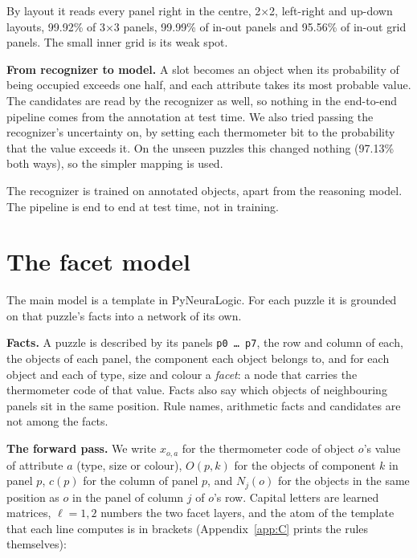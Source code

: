 By layout it reads every panel right in the centre, 2×2, left-right and up-down layouts, 99.92\% of 3×3 panels, 99.99\% of in-out panels and 95.56\% of in-out grid panels. The small inner grid is its weak spot.

\textbf{From recognizer to model.} A slot becomes an object when its probability of being occupied exceeds one half, and each attribute takes its most probable value. The candidates are read by the recognizer as well, so nothing in the end-to-end pipeline comes from the annotation at test time. We also tried passing the recognizer's uncertainty on, by setting each thermometer bit to the probability that the value exceeds it. On the unseen puzzles this changed nothing (97.13\% both ways), so the simpler mapping is used.

The recognizer is trained on annotated objects, apart from the reasoning model. The pipeline is end to end at test time, not in training.

\section{The facet model}\label{sec:4.4}

The main model is a template in PyNeuraLogic. For each puzzle it is grounded on that puzzle's facts into a network of its own.

\textbf{Facts.} A puzzle is described by its panels \texttt{p0 … p7}, the row and column of each, the objects of each panel, the component each object belongs to, and for each object and each of type, size and colour a \emph{facet}: a node that carries the thermometer code of that value. Facts also say which objects of neighbouring panels sit in the same position. Rule names, arithmetic facts and candidates are not among the facts.

\textbf{The forward pass.} We write \(x_{o,a}\) for the thermometer code of object \(o\)'s value of attribute \(a\) (type, size or colour), \(O(p,k)\) for the objects of component \(k\) in panel \(p\), \(c(p)\) for the column of panel \(p\), and \(N_j(o)\) for the objects in the same position as \(o\) in the panel of column \(j\) of \(o\)'s row. Capital letters are learned matrices, \(\ell = 1, 2\) numbers the two facet layers, and the atom of the template that each line computes is in brackets (Appendix~\ref{app:C} prints the rules themselves):


